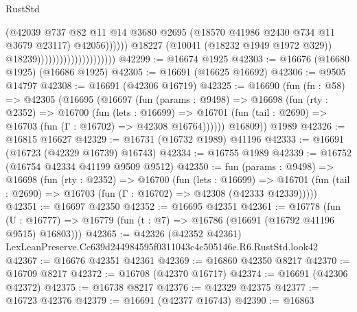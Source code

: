 \begin{lexlean}{RustStd}
\begin{coremodule}
                                                        (@42039
                                                          @737
                                                          @82
                                                          @11
                                                          @14
                                                          @3680
                                                          @2695
                                                          (@18570
                                                            @41986
                                                            @2430
                                                            @734
                                                            @11
                                                            @3679
                                                            @23117)
                                                          @42056))))))
                                              @18227
                                              (@10041 (@18232 @1949 @1972 @329))
                                              @18239)))))))))))))))))))))
@42299 := @16674 @1925
@42303 := @16676 (@16680 @1925) (@16686 @1925)
@42305 := @16691 (@16625 @16692)
@42306 := @9505 @14797
@42308 := @16691 (@42306 @16719)
@42325 := @16690
    (fun (fn : @58) =>
    @42305
      (@16695
        (@16697
          (fun (params : @9498) =>
          @16698
            (fun (rty : @2352) =>
            @16700
              (fun (lets : @16699) =>
              @16701 (fun (tail : @2690) => @16703 (fun (Γ : @16702) => @42308 @16764))))))
        @16809))
    @1989
@42326 := @16815 @16627
@42329 := @16731 (@16732 @1989) @41196
@42333 := @16691 (@16723 (@42329 @16739) @16743)
@42334 := @16755 @1989
@42339 := @16752 (@16754 @42334 @41199 @9509 @9512)
@42350 := fun (params : @9498) =>
  @16698
    (fun (rty : @2352) =>
    @16700
      (fun (lets : @16699) =>
      @16701 (fun (tail : @2690) => @16703 (fun (Γ : @16702) => @42308 (@42333 @42339)))))
@42351 := @16697 @42350
@42352 := @16695 @42351
@42361 := @16778
    (fun (U : @16777) => @16779 (fun (t : @7) => @16786 (@16691 (@16792 @41196 @9515) @16803)))
@42365 := @42326 (@42352 @42361) LexLeanPreserve.Cc639d244984595f0311043c4c505146e.R6.RustStd.look42
@42367 := @16676 @42351 @42361
@42369 := @16860 @42350 @8217
@42370 := @16709 @8217
@42372 := @16708 (@42370 @16717)
@42374 := @16691 (@42306 @42372)
@42375 := @16738 @8217
@42376 := @42329 @42375
@42377 := @16723 @42376
@42379 := @16691 (@42377 @16743)
@42390 := @16863

\end{coremodule}
\end{lexlean}
